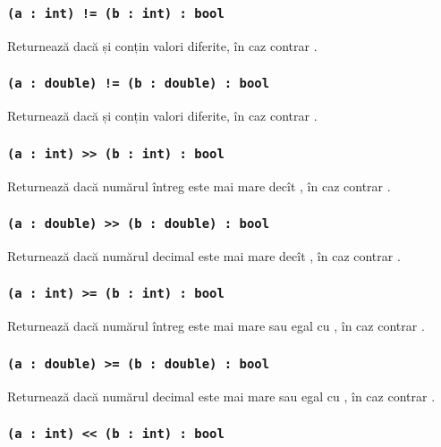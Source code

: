 \subsubsection{\lstinline|(a : int) != (b : int) : bool|}

Returnează \true{} dacă  și  conțin valori diferite, în caz contrar \false{}.

\subsubsection{\lstinline|(a : double) != (b : double) : bool|}

Returnează \true{} dacă  și  conțin valori diferite, în caz contrar \false{}.

\subsubsection{\lstinline|(a : int) >> (b : int) : bool|}

Returnează \true{} dacă numărul întreg  este mai mare decît , în caz contrar \false{}.

\subsubsection{\lstinline|(a : double) >> (b : double) : bool|}

Returnează \true{} dacă numărul decimal  este mai mare decît , în caz contrar \false{}.

\subsubsection{\lstinline|(a : int) >= (b : int) : bool|}

Returnează \true{} dacă numărul întreg  este mai mare sau egal cu , în caz contrar \false{}.

\subsubsection{\lstinline|(a : double) >= (b : double) : bool|}

Returnează \true{} dacă numărul decimal  este mai mare sau egal cu , în caz contrar \false{}.

\subsubsection{\lstinline|(a : int) << (b : int) : bool|}

